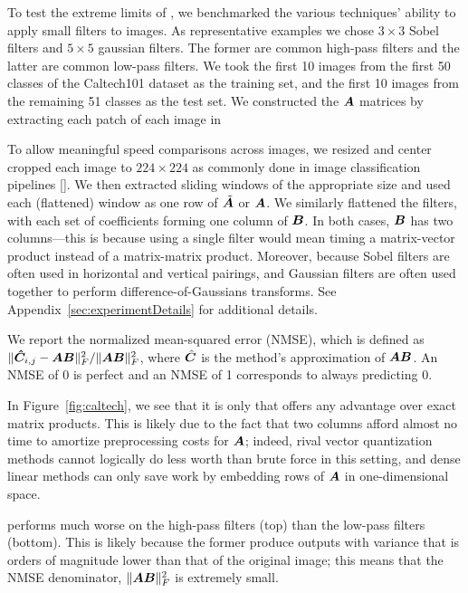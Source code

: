 To test the extreme limits of \ours, we benchmarked the various techniques' ability to apply small filters to images. As representative examples we chose $3 \times 3$ Sobel filters and $5 \times 5$ gaussian filters. The former are common high-pass filters and the latter are common low-pass filters. We took the first 10 images from the first 50 classes of the Caltech101 dataset as the training set, and the first 10 images from the remaining 51 classes as the test set. We constructed the $\bm{A}$ matrices by extracting each patch of each image in

To allow meaningful speed comparisons across images, we resized and center cropped each image to $224 \times 224$ as commonly done in image classification pipelines []. We then extracted sliding windows of the appropriate size and used each (flattened) window as one row of $\tilde{\bm{A}}$ or $\bm{A}$. We similarly flattened the filters, with each set of coefficients forming one column of $\bm{B}$. In both cases, $\bm{B}$ has two columns---this is because using a single filter would mean timing a matrix-vector product instead of a matrix-matrix product. Moreover, because Sobel filters are often used in horizontal and vertical pairings, and Gaussian filters are often used together to perform difference-of-Gaussians transforms. See Appendix~\ref{sec:experimentDetails} for additional details.

We report the normalized mean-squared error (NMSE), which is defined as $\lVert\bm{\hat{C}}_{i,j} - \bm{A}\bm{B}\rVert^2_F / \lVert\bm{A}\bm{B}\rVert^2_F$, where $\hat{\bm{C}}$ is the method's approximation of $\bm{A}\bm{B}$. An NMSE of 0 is perfect and an NMSE of 1 corresponds to always predicting 0.

In Figure~\ref{fig:caltech}, we see that it is only \oursp that offers any advantage over exact matrix products. This is likely due to the fact that two columns afford almost no time to amortize preprocessing costs for $\bm{A}$; indeed, rival vector quantization methods cannot logically do less worth than brute force in this setting, and dense linear methods can only save work by embedding rows of $\bm{A}$ in one-dimensional space.

\oursp performs much worse on the high-pass filters (top) than the low-pass filters (bottom). This is likely because the former produce outputs with variance that is orders of magnitude lower than that of the original image; this means that the NMSE denominator, $\lVert\bm{A}\bm{B}\rVert^2_F$ is extremely small.%


